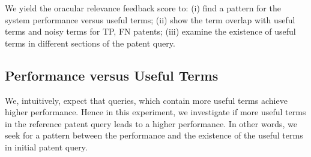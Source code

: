We yield the oracular relevance feedback score to: (i) find a pattern for the system performance versus useful terms; (ii) show the term overlap with useful terms and noisy terms for TP, FN patents; (iii)  examine the existence of useful terms in different sections of the patent query.
\subsection{Performance versus Useful Terms}
\label{PerformanceUsefulTerms}
We, intuitively, expect that queries, which contain more useful terms achieve higher performance. Hence in this experiment,
we investigate if more useful terms in the reference patent query leads to a higher performance. In other words, we seek for a pattern between the performance and the existence of the useful terms in initial patent query. 

